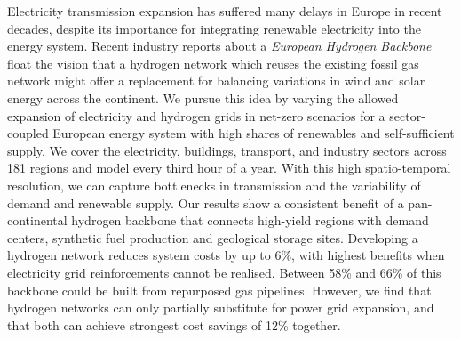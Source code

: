 Electricity transmission expansion has suffered many delays in Europe in recent
decades, despite its importance for integrating renewable electricity into the
energy system. Recent industry reports about a \textit{European Hydrogen
Backbone} float the vision that a hydrogen network which reuses the existing
fossil gas network might offer a replacement for balancing variations in wind
and solar energy across the continent. We pursue this idea by varying the
allowed expansion of electricity and hydrogen grids in net-zero \co scenarios
for a sector-coupled European energy system with high shares of renewables and
self-sufficient supply. We cover the electricity, buildings, transport, and
industry sectors across 181 regions and model every third hour of a year. With
this high spatio-temporal resolution, we can capture bottlenecks in transmission
and the variability of demand and renewable supply. Our results show a
consistent benefit of a pan-continental hydrogen backbone that connects
high-yield regions with demand centers, synthetic fuel production and geological
storage sites. Developing a hydrogen network reduces system costs by up to 6\%,
with highest benefits when electricity grid reinforcements cannot be realised.
Between 58\% and 66\% of this backbone could be built from repurposed gas
pipelines. However, we find that hydrogen networks can only partially substitute
for power grid expansion, and that both can achieve strongest cost savings of
12\% together.